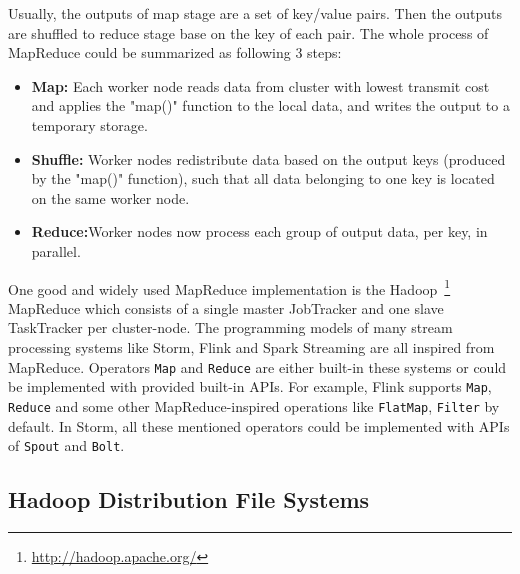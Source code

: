 Usually, the outputs of map stage are a set of key/value pairs. Then the outputs are shuffled to reduce stage base on the key of each pair. The whole process of MapReduce could be summarized as following 3 steps:
\begin{itemize}
  \item \textbf{Map:} Each worker node reads data from cluster with lowest transmit cost and applies the "map()" function to the local data, and writes the output to a temporary storage. 
  \item \textbf{Shuffle:} Worker nodes redistribute data based on the output keys (produced by the "map()" function), such that all data belonging to one key is located on the same worker node.
  \item \textbf{Reduce:}Worker nodes now process each group of output data, per key, in parallel.
\end{itemize}

One good and widely used MapReduce implementation is the Hadoop~\footnote{\url{http://hadoop.apache.org/}} MapReduce \cite{MapReduce} which consists of a single master JobTracker and one slave TaskTracker per cluster-node. The programming models of many stream processing systems like Storm, Flink and Spark Streaming are all inspired from MapReduce. Operators \texttt{Map} and \texttt{Reduce} are either built-in these systems or could be implemented with provided built-in APIs. For example, Flink supports \texttt{Map}, \texttt{Reduce} and some other MapReduce-inspired operations like \texttt{FlatMap}, \texttt{Filter} by default. In Storm, all these mentioned operators could be implemented with APIs of \texttt{Spout} and \texttt{Bolt}.



\subsection{Hadoop Distribution File Systems}
\label{subsection:hdfs}

